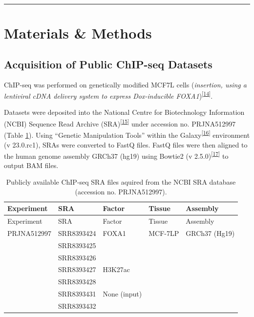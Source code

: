 \documentclass[
  12pt,
]{article}
\begin{document}
\begin{center}\rule{0.5\linewidth}{0.5pt}\end{center}

\hypertarget{materials-methods}{%
\section{Materials \& Methods}\label{materials-methods}}

\hypertarget{acquisition-of-public-chip-seq-datasets}{%
\subsection{Acquisition of Public ChIP-seq Datasets}\label{acquisition-of-public-chip-seq-datasets}}

ChIP-seq was performed on genetically modified MCF7L cells (\emph{insertion, using a lentiviral cDNA delivery system to express Dox-inducible FOXA1})\textsuperscript{{[}\protect\hyperlink{ref-fu2019}{14}{]}}.

Datasets were deposited into the National Centre for Biotechnology Information (NCBI) Sequence Read Archive (SRA)\textsuperscript{{[}\protect\hyperlink{ref-leinonen2010}{15}{]}} under accession no.
PRJNA512997 (Table \ref{tab:data}).
Using ``Genetic Manipulation Tools'' within the Galaxy\textsuperscript{{[}\protect\hyperlink{ref-thegala2022}{16}{]}} environment (v 23.0.rc1), SRAs were converted to FastQ files.
FastQ files were then aligned to the human genome assembly GRCh37 (hg19) using Bowtie2 (v 2.5.0)\textsuperscript{{[}\protect\hyperlink{ref-langmead2012}{17}{]}} to output BAM files.

\begin{longtable}[]{@{}lllll@{}}
\caption{\label{tab:data}Publicly available ChIP-seq SRA files aquired from the NCBI SRA database (accession no. PRJNA512997).}\tabularnewline
\toprule()
Experiment & SRA & Factor & Tissue & Assembly \\
\midrule()
\endfirsthead
\toprule()
Experiment & SRA & Factor & Tissue & Assembly \\
\midrule()
\endhead
PRJNA512997 & SRR8393424 & FOXA1 & MCF-7LP & GRCh37 (Hg19) \\
& SRR8393425 & & & \\
& SRR8393426 & & & \\
& SRR8393427 & H3K27ac & & \\
& SRR8393428 & & & \\
& SRR8393431 & None (input) & & \\
& SRR8393432 & & & \\
\bottomrule()
\end{longtable}
\end{document}
